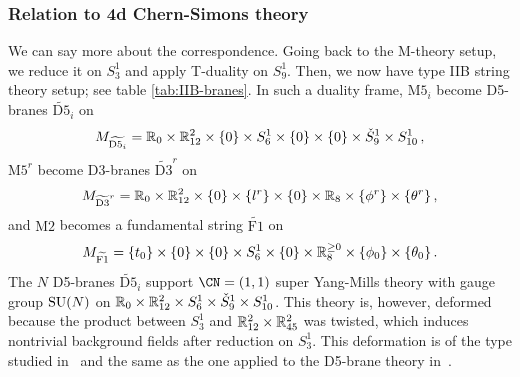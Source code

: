 \subsubsection{Relation to 4d Chern-Simons theory}


We can say more about the correspondence.
Going back to the M-theory setup, we reduce it on $S^1_3$ and apply
T-duality on $S^1_9$.  Then, we now have type IIB string theory setup;
see table \ref{tab:IIB-branes}.
In such a duality frame, $\mathrm{M5}_i$ become D5-branes
$\widetilde{\mathrm{D5}}_i$ on
\begin{equation}
  M_{\widetilde{\mathrm{D5}_i}}
  =
  \mathbb{R}_0 \times \mathbb{R}^2_{12} \times \{0\} \times S^1_6
  \times \{0\} \times \{0\} \times \check{S}^1_9 \times S^1_{10} \,,
\end{equation}
$\mathrm{M5}^r$ become D3-branes $\widetilde{\mathrm{D3}}^r$ on
\begin{equation}
  M_{\widetilde{\mathrm{D3}}^r}
  =
  \mathbb{R}_0 \times \mathbb{R}^2_{12} \times \{0\} \times \{l^r\}
  \times \{0\} \times \mathbb{R}_8 \times \{\phi^r\} \times \{\theta^r\} \,,
\end{equation}
and $\mathrm{M2}$ becomes a fundamental string $\widetilde{\mathrm{F1}}$ on
\begin{equation}
  M_{\widetilde{\mathrm{F1}}}
  =
  \{t_0\} \times \{0\} \times \{0\}
  \times S^1_6 \times \{0\} \times \mathbb{R}^{\geq0}_8
  \times \{\phi_0\} \times \{\theta_0\} \,.
\end{equation}
The $N$ D5-branes $\widetilde{\mathrm{D5}}_i$ support $\CN = (1,1)$
super Yang-Mills theory with gauge group $\mathrm{SU}(N)$ on
$\mathbb{R}_0 \times \mathbb{R}^2_{12} \times S^1_6 \times \check{S}^1_9 \times
S^1_{10}$.  This theory is, however, deformed because the product
between $S^1_3$ and $\mathbb{R}^2_{12} \times \mathbb{R}^2_{45}$ was twisted, which
induces nontrivial background fields after reduction on $S^1_3$.  This
deformation is of the type studied in~\cite{Yagi:2014toa} and the same
as the one applied to the D5-brane theory in~\cite{Costello:2018txb}.%
%
